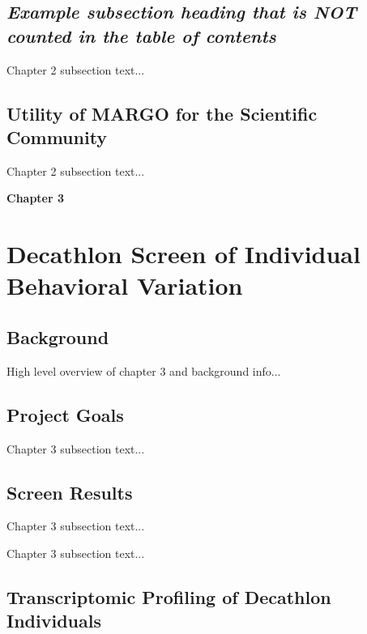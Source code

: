 \documentclass[12pt,letterpaper]{article}
\begin{document}
\subsection*{\textit{Example subsection heading that is NOT counted in the table of contents}}

Chapter 2 subsection text...

\subsection{Utility of MARGO for the Scientific Community}

Chapter 2 subsection text...

\clearpage
\begin{center}
    \Large\textbf{Chapter 3}
    \thispagestyle{empty}       %
    \clearpage
\end{center}

\section{Decathlon Screen of Individual Behavioral Variation}

\subsection{Background}

High level overview of chapter 3 and background info...


\subsection{Project Goals}

Chapter 3 subsection text...


\subsection{Screen Results}

Chapter 3 subsection text...



Chapter 3 subsection text...


\subsection{Transcriptomic Profiling of Decathlon Individuals}
\end{document}
